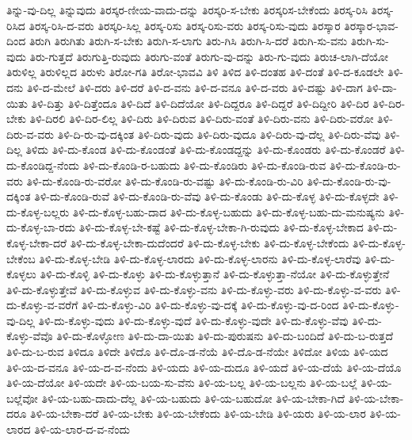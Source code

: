 {ತಿನ್ನು-ವು-ದಿಲ್ಲ
ತಿನ್ನುವುದು
ತಿರಸ್ಕರ-ಣೀಯ-ವಾದು-ದನ್ನು
ತಿರಸ್ಕರಿ-ಸ-ಬೇಕು
ತಿರಸ್ಕರಿಸ-ಬೇಕೆಂದು
ತಿರಸ್ಕ-ರಿಸಿ
ತಿರಸ್ಕ-ರಿಸಿದ
ತಿರಸ್ಕ-ರಿಸಿ-ದ-ವರು
ತಿರಸ್ಕರಿ-ಸಿಲ್ಲ
ತಿರಸ್ಕ-ರಿಸು
ತಿರಸ್ಕ-ರಿಸು-ವರು
ತಿರಸ್ಕ-ರಿಸು-ವುದು
ತಿರಸ್ಕಾರ
ತಿರಸ್ಕಾರ-ಭಾವ-ದಿಂದ
ತಿರುಗಿ
ತಿರುಗಿತು
ತಿರುಗಿ-ಸ-ಬೇಕು
ತಿರುಗಿ-ಸ-ಲಾಗು
ತಿರು-ಗಿಸಿ
ತಿರುಗಿ-ಸಿ-ದರೆ
ತಿರುಗಿ-ಸು-ವನು
ತಿರುಗಿ-ಸು-ವುದು
ತಿರು-ಗುತ್ತದೆ
ತಿರುಗುತ್ತಿ-ರುವುದು
ತಿರುಗು-ವಂತೆ
ತಿರುಗು-ವು-ದನ್ನು
ತಿರು-ಗು-ವುದು
ತಿರುಚ-ಲಾಗಿ-ದೆಯೋ
ತಿರುಳಿಲ್ಲ
ತಿರುಳಿಲ್ಲದ
ತಿರುಳು
ತಿರೋ-ಗತಿ
ತಿರೋ-ಭಾವವಿ
ತಿಳಿ
ತಿಳಿದ
ತಿಳಿ-ದಂತಹ
ತಿಳಿ-ದಂತೆ
ತಿಳಿ-ದ-ಕೂಡಲೇ
ತಿಳಿ-ದನು
ತಿಳಿ-ದ-ಮೇಲೆ
ತಿಳಿ-ದರು
ತಿಳಿ-ದರೆ
ತಿಳಿ-ದ-ವನು
ತಿಳಿ-ದ-ವನೂ
ತಿಳಿ-ದ-ವರು
ತಿಳಿ-ದಷ್ಟು
ತಿಳಿ-ದಾಗ
ತಿಳಿ-ದಾ-ಯಿತು
ತಿಳಿ-ದಿತ್ತು
ತಿಳಿ-ದಿತ್ತೆಂದೂ
ತಿಳಿ-ದಿದೆ
ತಿಳಿ-ದಿದೆಯೋ
ತಿಳಿ-ದಿದ್ದರೂ
ತಿಳಿ-ದಿದ್ದರೆ
ತಿಳಿ-ದಿದ್ದೀರಿ
ತಿಳಿ-ದಿರ
ತಿಳಿ-ದಿರ-ಬೇಕು
ತಿಳಿ-ದಿರಲಿ
ತಿಳಿ-ದಿರ-ಲಿಲ್ಲ
ತಿಳಿ-ದಿರು
ತಿಳಿ-ದಿರುವ
ತಿಳಿ-ದಿರು-ವಂತೆ
ತಿಳಿ-ದಿರು-ವನು
ತಿಳಿ-ದಿರು-ವರೋ
ತಿಳಿ-ದಿರು-ವ-ವರು
ತಿಳಿ-ದಿ-ರು-ವು-ದಕ್ಕಿಂತ
ತಿಳಿ-ದಿರು-ವುದು
ತಿಳಿ-ದಿರು-ವುದೂ
ತಿಳಿ-ದಿರು-ವು-ದೆಲ್ಲ
ತಿಳಿ-ದಿರು-ವೆವು
ತಿಳಿ-ದಿಲ್ಲ
ತಿಳಿದು
ತಿಳಿ-ದು-ಕೊಂಡ
ತಿಳಿ-ದು-ಕೊಂಡಂತೆ
ತಿಳಿ-ದು-ಕೊಂಡದ್ದನ್ನು
ತಿಳಿ-ದು-ಕೊಂಡರು
ತಿಳಿ-ದು-ಕೊಂಡರೆ
ತಿಳಿ-ದು-ಕೊಂಡಿದ್ದ-ನೆಂದು
ತಿಳಿ-ದು-ಕೊಂಡಿ-ರ-ಬಹುದು
ತಿಳಿ-ದು-ಕೊಂಡಿರು
ತಿಳಿ-ದು-ಕೊಂಡಿ-ರುವ
ತಿಳಿ-ದು-ಕೊಂಡಿ-ರು-ವರು
ತಿಳಿ-ದು-ಕೊಂಡಿ-ರು-ವರೋ
ತಿಳಿ-ದು-ಕೊಂಡಿ-ರು-ವಷ್ಟು
ತಿಳಿ-ದು-ಕೊಂಡಿ-ರು-ವಿರಿ
ತಿಳಿ-ದು-ಕೊಂಡಿ-ರು-ವು-ದಕ್ಕಿಂತ
ತಿಳಿ-ದು-ಕೊಂಡಿ-ರುವೆ
ತಿಳಿ-ದು-ಕೊಂಡಿ-ರು-ವೆವು
ತಿಳಿ-ದು-ಕೊಂಡು
ತಿಳಿ-ದು-ಕೊಳ್ಳ
ತಿಳಿ-ದು-ಕೊಳ್ಳದೇ
ತಿಳಿ-ದು-ಕೊಳ್ಳ-ಬಲ್ಲರು
ತಿಳಿ-ದು-ಕೊಳ್ಳ-ಬಹು-ದಾದ
ತಿಳಿ-ದು-ಕೊಳ್ಳ-ಬಹುದು
ತಿಳಿ-ದು-ಕೊಳ್ಳ-ಬಹು-ದು-ಮನುಷ್ಯನು
ತಿಳಿ-ದು-ಕೊಳ್ಳ-ಬಾ-ರದು
ತಿಳಿ-ದು-ಕೊಳ್ಳ-ಬೇ-ಕಷ್ಟೆ
ತಿಳಿ-ದು-ಕೊಳ್ಳ-ಬೇಕಾ-ಗಿ-ರುವುದು
ತಿಳಿ-ದು-ಕೊಳ್ಳ-ಬೇಕಾದ
ತಿಳಿ-ದು-ಕೊಳ್ಳ-ಬೇಕಾ-ದರೆ
ತಿಳಿ-ದು-ಕೊಳ್ಳ-ಬೇಕಾ-ದುದೆಂದರೆ
ತಿಳಿ-ದು-ಕೊಳ್ಳ-ಬೇಕು
ತಿಳಿ-ದು-ಕೊಳ್ಳ-ಬೇಕೆಂದು
ತಿಳಿ-ದು-ಕೊಳ್ಳ-ಬೇಕೆಂಬ
ತಿಳಿ-ದು-ಕೊಳ್ಳ-ಬೇಡಿ
ತಿಳಿ-ದು-ಕೊಳ್ಳ-ಲಾರದು
ತಿಳಿ-ದು-ಕೊಳ್ಳ-ಲಾರನು
ತಿಳಿ-ದು-ಕೊಳ್ಳ-ಲಾರೆವು
ತಿಳಿ-ದು-ಕೊಳ್ಳಲು
ತಿಳಿ-ದು-ಕೊಳ್ಳಿ
ತಿಳಿ-ದು-ಕೊಳ್ಳು
ತಿಳಿ-ದು-ಕೊಳ್ಳುತ್ತಾನೆ
ತಿಳಿ-ದು-ಕೊಳ್ಳುತ್ತಾ-ನೆಯೋ
ತಿಳಿ-ದು-ಕೊಳ್ಳುತ್ತೇನೆ
ತಿಳಿ-ದು-ಕೊಳ್ಳುತ್ತೇವೆ
ತಿಳಿ-ದು-ಕೊಳ್ಳುವ
ತಿಳಿ-ದು-ಕೊಳ್ಳು-ವನು
ತಿಳಿ-ದು-ಕೊಳ್ಳು-ವರು
ತಿಳಿ-ದು-ಕೊಳ್ಳು-ವ-ವರು
ತಿಳಿ-ದು-ಕೊಳ್ಳು-ವ-ವರೆಗೆ
ತಿಳಿ-ದು-ಕೊಳ್ಳು-ವಿರಿ
ತಿಳಿ-ದು-ಕೊಳ್ಳು-ವು-ದಕ್ಕೆ
ತಿಳಿ-ದು-ಕೊಳ್ಳು-ವು-ದ-ರಿಂದ
ತಿಳಿ-ದು-ಕೊಳ್ಳು-ವು-ದಿಲ್ಲ
ತಿಳಿ-ದು-ಕೊಳ್ಳು-ವುದು
ತಿಳಿ-ದು-ಕೊಳ್ಳು-ವುದೆ
ತಿಳಿ-ದು-ಕೊಳ್ಳು-ವುದೇ
ತಿಳಿ-ದು-ಕೊಳ್ಳು-ವೆವು
ತಿಳಿ-ದು-ಕೊಳ್ಳು-ವೆವೊ
ತಿಳಿ-ದು-ಕೊಳ್ಳೋಣ
ತಿಳಿ-ದು-ದಾ-ಯಿತು
ತಿಳಿ-ದು-ಪುರುಷನು
ತಿಳಿ-ದು-ಬಂದಿದೆ
ತಿಳಿ-ದು-ಬ-ರುತ್ತದೆ
ತಿಳಿ-ದು-ಬ-ರುವ
ತಿಳಿದೂ
ತಿಳಿದೇ
ತಿಳಿದೊ
ತಿಳಿ-ದೊ-ಡ-ನೆಯೆ
ತಿಳಿ-ದೊ-ಡ-ನೆಯೇ
ತಿಳಿದೋ
ತಿಳಿಯ
ತಿಳಿ-ಯದ
ತಿಳಿ-ಯ-ದ-ವನೂ
ತಿಳಿ-ಯ-ದ-ವ-ನೆಂದು
ತಿಳಿ-ಯದು
ತಿಳಿ-ಯ-ದುದೂ
ತಿಳಿ-ಯದೆ
ತಿಳಿ-ಯ-ದೆಯೆ
ತಿಳಿ-ಯ-ದೆಯೊ
ತಿಳಿ-ಯ-ದೆಯೋ
ತಿಳಿ-ಯದೇ
ತಿಳಿ-ಯ-ಬಯ-ಸು-ವೆನು
ತಿಳಿ-ಯ-ಬಲ್ಲ
ತಿಳಿ-ಯ-ಬಲ್ಲನು
ತಿಳಿ-ಯ-ಬಲ್ಲೆ
ತಿಳಿ-ಯ-ಬಲ್ಲೆವೋ
ತಿಳಿ-ಯ-ಬಹು-ದಾದು-ದೆಲ್ಲ
ತಿಳಿ-ಯ-ಬಹುದು
ತಿಳಿ-ಯ-ಬಹುದೋ
ತಿಳಿ-ಯ-ಬೇಕಾ-ಗಿದೆ
ತಿಳಿ-ಯ-ಬೇಕಾ-ದರೂ
ತಿಳಿ-ಯ-ಬೇಕಾ-ದರೆ
ತಿಳಿ-ಯ-ಬೇಕು
ತಿಳಿ-ಯ-ಬೇಕೆಂದು
ತಿಳಿ-ಯ-ಬೇಡಿ
ತಿಳಿ-ಯರು
ತಿಳಿ-ಯ-ಲಾರ
ತಿಳಿ-ಯ-ಲಾರದ
ತಿಳಿ-ಯ-ಲಾರ-ದ-ವ-ನೆಂದು
}
